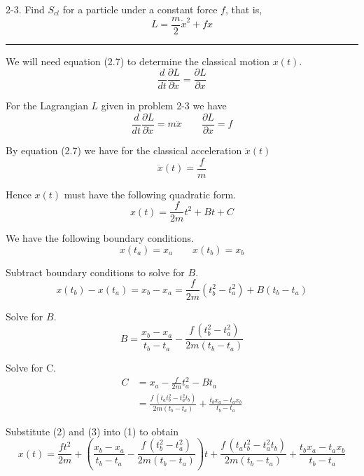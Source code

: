 \documentclass[12pt]{article}
\begin{document}
2-3.
Find $S_{cl}$ for a particle under a constant force $f$, that is,
\begin{equation*}
L=\frac{m}{2}\dot x^2+fx
\end{equation*}

\bigskip
\hrule

\bigskip
We will need equation (2.7) to determine the classical motion $x(t)$.
\begin{equation*}
\frac{d}{dt}\frac{\partial L}{\partial\dot x}=\frac{\partial L}{\partial x}
\tag{2.7}
\end{equation*}

For the Lagrangian $L$ given in problem 2-3 we have
\begin{equation*}
\frac{d}{dt}\frac{\partial L}{\partial\dot x}=m\ddot x
\qquad
\frac{\partial L}{\partial x}=f
\end{equation*}

By equation (2.7) we have for the classical acceleration $\ddot x(t)$
\begin{equation*}
\ddot x(t)=\frac{f}{m}
\end{equation*}

Hence $x(t)$ must have the following quadratic form.
\begin{equation*}
x(t)=\frac{f}{2m}t^2+Bt+C
\tag{1}
\end{equation*}

We have the following boundary conditions.
\begin{equation*}
x(t_a)=x_a
\qquad
x(t_b)=x_b
\end{equation*}

Subtract boundary conditions to solve for $B$.
\begin{equation*}
x(t_b)-x(t_a)
=x_b-x_a
=\frac{f}{2m}\left(t_b^2-t_a^2\right)+B(t_b-t_a)
\end{equation*}

Solve for $B$.
\begin{equation*}
B=\frac{x_b-x_a}{t_b-t_a}-\frac{f\,\left(t_b^2-t_a^2\right)}{2m(t_b-t_a)}
\tag{2}
\end{equation*}

Solve for C.
\begin{align*}
C&=x_a-\frac{f}{2m}t_a^2-Bt_a
\\[1ex]
&=\frac{f\,\left(t_a t_b^2 - t_a^2 t_b\right)}{2 m (t_b - t_a)} + \frac{t_b x_a - t_a x_b}{t_b - t_a}
\tag{3}
\end{align*}

Substitute (2) and (3) into (1) to obtain
\begin{equation*}
x(t)=
\frac{ft^2}{2m}
+\left(\frac{x_b-x_a}{t_b-t_a}-\frac{f\,\left(t_b^2-t_a^2\right)}{2m(t_b-t_a)}\right)t
+\frac{f\,\left(t_a t_b^2 - t_a^2 t_b\right)}{2 m (t_b - t_a)} + \frac{t_b x_a - t_a x_b}{t_b - t_a}
\tag{4}
\end{equation*}
\end{document}
